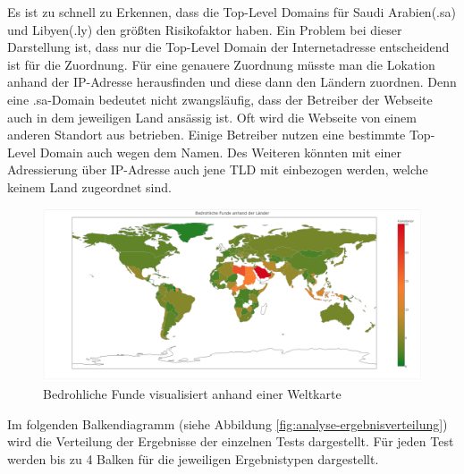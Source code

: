 Es ist zu schnell zu Erkennen, dass die Top-Level Domains für Saudi Arabien(.sa) und Libyen(.ly) den größten Risikofaktor haben. Ein Problem bei dieser Darstellung ist, dass nur die Top-Level Domain der Internetadresse entscheidend ist für die Zuordnung. Für eine genauere Zuordnung müsste man die Lokation anhand der IP-Adresse herausfinden und diese dann den Ländern zuordnen. Denn eine .sa-Domain bedeutet nicht zwangsläufig, dass der Betreiber der Webseite auch in dem jeweiligen Land ansässig ist. Oft wird die Webseite von einem anderen Standort aus betrieben. Einige Betreiber nutzen eine bestimmte Top-Level Domain auch wegen dem Namen. Des Weiteren könnten mit einer Adressierung über IP-Adresse auch jene \ac{TLD} mit einbezogen werden, welche keinem Land zugeordnet sind.

\begin{figure}[H]
  \centering
  \includegraphics[width=15cm]{images/stats/weltkarte}
  \caption{Bedrohliche Funde visualisiert anhand einer Weltkarte\protect\footnotemark}
  \label{fig:analyse-weltkarte}
\end{figure}

Im folgenden Balkendiagramm (siehe Abbildung \ref{fig:analyse-ergebnisverteilung}) wird die Verteilung der Ergebnisse der einzelnen Tests dargestellt. Für jeden Test werden bis zu 4 Balken für die jeweiligen Ergebnistypen dargestellt.

